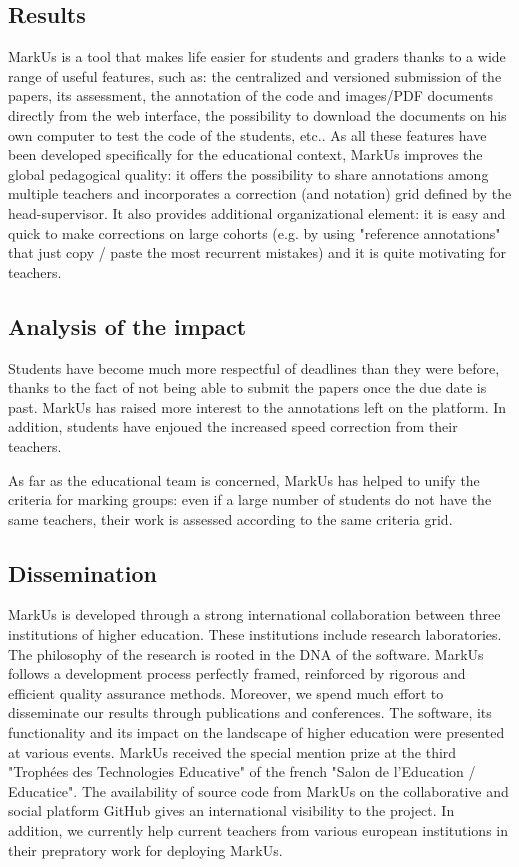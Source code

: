 \documentclass[twocolumn,10pt]{asme2e}
\begin{document}
\subsection*{Results}

MarkUs is a tool that makes life easier for students and graders thanks to a wide range of useful features, such as: the centralized and versioned submission of the papers, its assessment, the annotation of the code and images/PDF documents directly from the web interface, the possibility to download the documents on his own computer to test the code of the students, etc.. As all these  features have been developed specifically for the educational context, MarkUs improves the global pedagogical quality: it offers the possibility to share annotations among multiple teachers and incorporates a correction (and notation) grid defined by the head-supervisor. It also provides additional organizational element: it is easy and quick to make corrections on large cohorts (e.g. by using "reference annotations" that just copy / paste the most recurrent mistakes) and it is quite motivating for teachers. 

\subsection*{Analysis of the impact}

Students have become much more respectful of deadlines than they were before, thanks to the fact of not being able to submit the papers once the due date is past. MarkUs has raised more interest to the annotations left on the platform. In addition, students have enjoued the increased speed correction from their teachers. 

As far as the educational team is concerned, MarkUs has helped to unify the criteria for marking groups: even if a large number of students do not have the same teachers, their work is assessed according to the same criteria grid. 

\subsection*{Dissemination}

MarkUs is developed through a strong international collaboration between three institutions of higher education. These institutions include research laboratories. The philosophy of the research is rooted in the DNA of the software. MarkUs follows a development process perfectly framed, reinforced by rigorous and efficient quality assurance methods. Moreover, we spend much effort to disseminate our results through publications and conferences. The software, its functionality and its impact on the landscape of higher education were presented at various events. MarkUs received the special mention prize at the third "Troph\'{e}es des Technologies Educative" of the french "Salon de l'Education / Educatice". 
The availability of source code from MarkUs on the collaborative and social platform GitHub gives an international visibility to the project. In addition, we currently help current teachers from various european institutions in their prepratory work  for deploying MarkUs.
\end{document}
